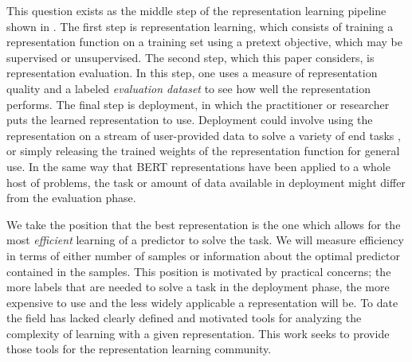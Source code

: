 This question exists as the middle step of the representation learning pipeline shown in .
The first step is representation learning, which consists of training a representation function on a training set using a pretext objective, which may be supervised or unsupervised.
The second step, which this paper considers, is representation evaluation.
In this step, one uses a measure of representation quality and a labeled \emph{evaluation dataset} to see how well the representation performs.
The final step is deployment, in which the practitioner or researcher puts the learned representation to use.
Deployment could involve using the representation on a stream of user-provided data to solve a variety of end tasks \citep{embedtheworld}, or simply releasing the trained weights of the representation function for general use.
In the same way that BERT \citep{devlin2018bert} representations have been applied to a whole host of problems, the task or amount of data available in deployment might differ from the evaluation phase.



We take the position that the best representation is the one which allows for the most \emph{efficient} learning of a predictor to solve the task.
We will measure efficiency in terms of either number of samples or information about the optimal predictor contained in the samples.
This position is motivated by practical concerns; the more labels that are needed to solve a task in the deployment phase, the more expensive to use and the less widely applicable a representation will be.
To date the field has lacked clearly defined and motivated tools for analyzing the complexity of learning with a given representation.
This work seeks to
provide those tools for the representation learning community.

